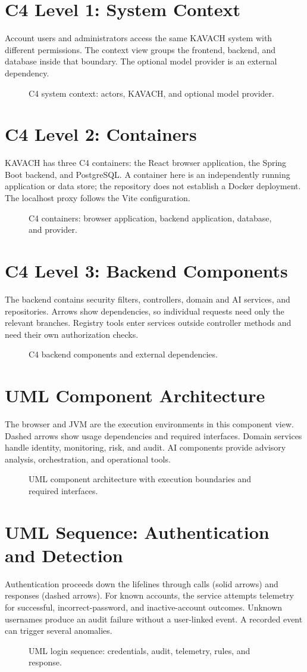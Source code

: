 \newsavebox{\KDiagramRaw}
\newsavebox{\KDiagramScaled}
\newcommand{\diagramview}[4]{%
\clearpage\section{#1}
#2
\legendline
\begin{figure}[!ht]\centering
\sbox{\KDiagramRaw}{}
\ifdim\wd\KDiagramRaw>\textwidth
 \sbox{\KDiagramScaled}{\resizebox{\textwidth}{!}{\usebox{\KDiagramRaw}}}
\else\sbox{\KDiagramScaled}{\usebox{\KDiagramRaw}}\fi
\ifdim\dimexpr\ht\KDiagramScaled+\dp\KDiagramScaled\relax>16cm
 \resizebox*{!}{16cm}{\usebox{\KDiagramScaled}}
\else\usebox{\KDiagramScaled}\fi
\caption{#4}\end{figure}}

\diagramview{C4 Level 1: System Context}{Account users and administrators access the same KAVACH system with different permissions. The context view groups the frontend, backend, and database inside that boundary. The optional model provider is an external dependency.}{c4-context}{C4 system context: actors, KAVACH, and optional model provider.}

\diagramview{C4 Level 2: Containers}{KAVACH has three C4 containers: the React browser application, the Spring Boot backend, and PostgreSQL. A container here is an independently running application or data store; the repository does not establish a Docker deployment. The localhost proxy follows the Vite configuration.}{c4-containers}{C4 containers: browser application, backend application, database, and provider.}

\diagramview{C4 Level 3: Backend Components}{The backend contains security filters, controllers, domain and AI services, and repositories. Arrows show dependencies, so individual requests need only the relevant branches. Registry tools enter services outside controller methods and need their own authorization checks.}{c4-components}{C4 backend components and external dependencies.}

\diagramview{UML Component Architecture}{The browser and JVM are the execution environments in this component view. Dashed arrows show usage dependencies and required interfaces. Domain services handle identity, monitoring, risk, and audit. AI components provide advisory analysis, orchestration, and operational tools.}{uml-architecture}{UML component architecture with execution boundaries and required interfaces.}

\diagramview{UML Sequence: Authentication and Detection}{Authentication proceeds down the lifelines through calls (solid arrows) and responses (dashed arrows). For known accounts, the service attempts telemetry for successful, incorrect-password, and inactive-account outcomes. Unknown usernames produce an audit failure without a user-linked event. A recorded event can trigger several anomalies.}{sequence-login}{UML login sequence: credentials, audit, telemetry, rules, and response.}

